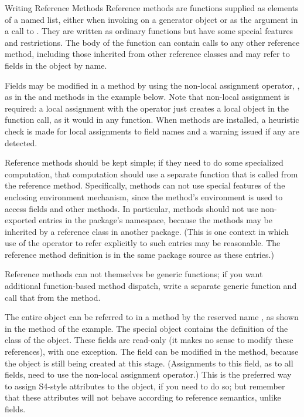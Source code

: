 \begin{Section}{Writing Reference Methods}
Reference methods are functions supplied as elements of a named list,
either
when invoking  
on a generator object  or as
the argument  in a call to .
They are written as ordinary \R{} functions but have some special
features and restrictions.
The body of the function can contain calls to any other reference method,
including those inherited from other reference classes and may refer
to fields in the object by name.

Fields may be modified in a method by using the
non-local assignment operator, \code{<{}<-}, as in the  and 
methods in the example below.
Note that non-local assignment is required:  a local assignment with
the \code{<-} operator just creates a local object in the function
call, as it would in any \R{} function.
When methods are installed, a heuristic check is made for local
assignments to field names and a warning issued if any are detected.

Reference methods should be kept simple; if they need to do some
specialized \R{} computation, that computation should use a separate \R{}
function that is called from the reference method.
Specifically, methods can not use special features of the
enclosing environment mechanism, since the method's environment is
used to access fields and other methods.
In particular, methods should not use non-exported entries in the
package's namespace, because the methods may be inherited by a
reference class in another package.
(This is one context in which use of the  operator to
refer explicitly to such entries may be reasonable.  The reference
method definition is in the same package source as these entries.)

Reference methods can not themselves be generic functions; if you want
additional function-based method dispatch, write a separate generic
function and call that from the method.

The entire object can be referred to in a method by the reserved
name , as shown in the  method of the
example.
The special object  contains the definition of the
class of the object.
These fields are read-only (it makes no sense to modify these
references), with one exception.
The  field can be modified in the  
method, because the object is still being created at this stage.
(Assignments to this field, as to all fields, need to use the
non-local assignment operator.)
This is the preferred way to assign S4-style attributes to the object,
if you need to do so; but remember that these attributes will not
behave according to reference semantics, unlike fields.


\end{Section}
